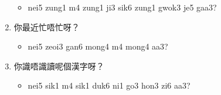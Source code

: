 \documentclass[12pt,a4paper]{leaflet}
\begin{document}
\begin{tcolorbox}[enhanced, breakable, skin first=enhanced, skin middle=enhanced, skin last=enhanced,colback=LightGreen!20!white, colframe=LightGreen!50!black, boxrule=0.5mm]
\begin{enumerate}[label={},leftmargin=0pt, itemindent=0pt]
\begin{itemize}[label={},leftmargin=0pt, itemindent=0pt]
\item \footnotesize\textsf{nei5 zung1 m4 zung1 ji3 sik6 zung1 gwok3 je5 gaa3?}
\end{itemize}
\item \LARGE{你最近忙唔忙呀？}
\begin{itemize}[label={},leftmargin=0pt, itemindent=0pt]
\item \footnotesize\textsf{nei5 zeoi3 gan6 mong4 m4 mong4 aa3?}
\end{itemize}
\item \LARGE{你識唔識讀呢個漢字呀？}
\begin{itemize}[label={},leftmargin=0pt, itemindent=0pt]
\item \footnotesize\textsf{nei5 sik1 m4 sik1 duk6 ni1 go3 hon3 zi6 aa3?}
\end{itemize}
\end{enumerate}
\end{tcolorbox}
\end{document}
